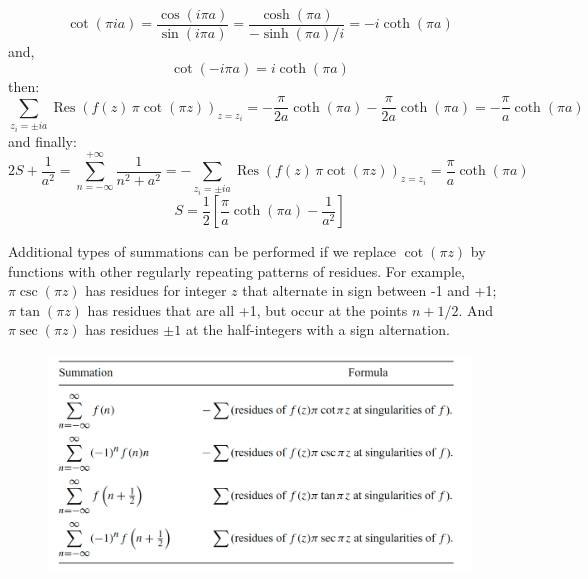 \documentclass{article}
\begin{document}
\begin{equation}
    \cot(\pi i a) = \frac{\cos(i \pi a)}{\sin(i \pi a)} 
= \frac{\cosh(\pi a)}{-\sinh(\pi a)/i} 
= -i \coth(\pi a)
\end{equation}
and,
\begin{equation}
    \cot (-i\pi a) = i \coth (\pi a)
\end{equation}
then:
\begin{equation}
    \sum_{z_i = \pm i a} \operatorname{Res} \left( f(z) \, \pi \cot(\pi z) \right)_{z=z_i} 
= -\frac{\pi}{2a} \coth(\pi a) - \frac{\pi}{2a} \coth(\pi a) 
= -\frac{\pi}{a} \coth(\pi a)
\end{equation}
and finally:
\begin{equation}
    2S + \frac{1}{a^2} = \sum_{n=-\infty}^{+\infty} \frac{1}{n^2 + a^2} 
= - \sum_{z_i = \pm i a} \operatorname{Res} \left( f(z) \, \pi \cot(\pi z) \right)_{z=z_i} 
= \frac{\pi}{a} \coth(\pi a)
\end{equation}
\begin{equation}
    S = \frac{1}{2} \left[ \frac{\pi}{a} \coth(\pi a) - \frac{1}{a^2} \right]
\end{equation}

\vspace{3mm}\noindent
Additional types of summations can be performed if we replace $\cot(\pi z)$ by functions with other regularly repeating patterns of residues. For example, $\pi \csc(\pi z)$ has residues for integer $z$ that alternate in sign between -1 and +1; $\pi \tan(\pi z)$ has residues that are all +1, but occur at the points $n+1/2$. And $\pi \sec(\pi z)$ has residues $\pm1$ at the half-integers with a sign alternation.

\begin{figure}[h]
    \centering
    \includegraphics[width=0.85\linewidth]{fig49.png}
\end{figure}

\end{document}
